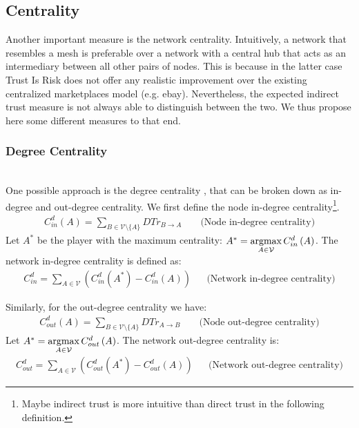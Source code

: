 \subsection{Centrality}
  Another important measure is the network centrality. Intuitively, a network that resembles a mesh is preferable over a
  network with a central hub that acts as an intermediary between all other pairs of nodes. This is because in the latter case
  Trust Is Risk does not offer any realistic improvement over the existing centralized marketplaces model (e.g. ebay).
  Nevertheless, the expected indirect trust measure is not always able to distinguish between the two. We thus propose here
  some different measures to that end.
  
  \subsubsection{Degree Centrality} \ \\

    One possible approach is the degree centrality \cite{freeman}, that can be broken down as in-degree and out-degree
    centrality. We first define the node in-degree centrality\footnote{Maybe indirect trust is more intuitive than direct
    trust in the following definition.}.
    \begin{align*}
      C^d_{in}\left(A\right) = \sum\limits_{B \in \mathcal{V} \setminus \{A\}}DTr_{B \rightarrow A} && \mbox{ (Node in-degree
      centrality)}
    \end{align*}
    Let $A^*$ be the player with the maximum centrality: $A^* = \operatorname*{argmax}\limits_{A \in \mathcal{V}}C^d_{in}\left(A\right)$. The
    network in-degree centrality is defined as:
    \begin{align*}
      C^d_{in} = \sum\limits_{A \in \mathcal{V}}\left(C^d_{in}\left(A^*\right) - C^d_{in}\left(A\right)\right) && \mbox{
      (Network in-degree centrality)}
    \end{align*}
    \addtocounter{footnote}{-1}
    Similarly, for the out-degree centrality we have\footnotemark:
    \begin{align*}
      C^d_{out}\left(A\right) = \sum\limits_{B \in \mathcal{V} \setminus \{A\}}DTr_{A \rightarrow B} && \mbox{ (Node
      out-degree centrality)}
    \end{align*}
    Let $A^* = \operatorname*{argmax}\limits_{A \in \mathcal{V}}C^d_{out}\left(A\right)$. The network out-degree centrality is:
    \begin{align*}
      C^d_{out} = \sum\limits_{A \in \mathcal{V}}\left(C^d_{out}\left(A^*\right) - C^d_{out}\left(A\right)\right) && \mbox{
      (Network out-degree centrality)}
    \end{align*}

